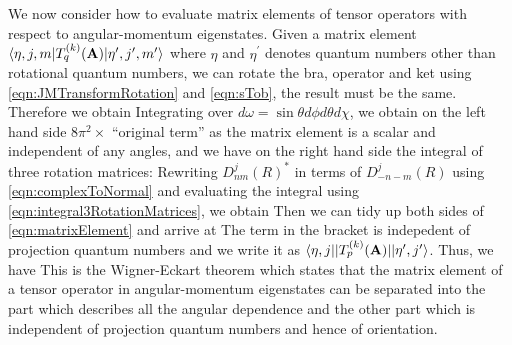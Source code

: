  We now consider how to evaluate  matrix elements of tensor operators with respect to angular-momentum eigenstates. 
Given a matrix element $\langle \eta, j, m | T_q^{(k)}(\mathbf{A})  | \eta^{\prime}, j^{\prime}, m^{\prime} \rangle$ where
$\eta$ and $\eta^{\prime}$ denotes quantum numbers other than rotational quantum numbers, we can rotate the bra, 
operator and ket using \autoref{eqn:JMTransformRotation} and \autoref{eqn:sTob}, the result must be the same. 
Therefore we obtain
Integrating over $d\omega = \sin\theta d\phi d\theta d\chi$, we obtain on the left hand side $8\pi^2 \times$ ``original 
term'' as the matrix element is a scalar and independent of any angles, and we have on the right hand side the integral of three rotation matrices:
Rewriting $D^j_{n m}(R)^*$ in terms of $D^j_{-n -m}(R)$ using \autoref{eqn:complexToNormal} and evaluating the integral 
using \autoref{eqn:integral3RotationMatrices}, we obtain
Then we can tidy up both sides of \autoref{eqn:matrixElement} and arrive at
The term in the bracket is indepedent of projection quantum numbers and we write it as $\langle \eta, j | |T_p^{(k)}(\mathbf{A})|  | \eta^{\prime}, j^{\prime} \rangle$. Thus, we have
This is the Wigner-Eckart theorem which states that the matrix element of a tensor operator in angular-momentum
eigenstates can be separated into the part which describes all the angular dependence  and the other part which is 
independent of projection quantum numbers and hence of orientation. 

